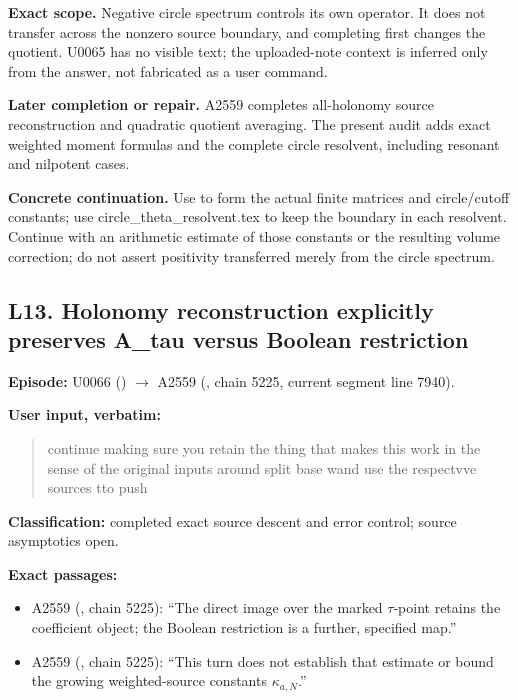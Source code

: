 \documentclass[10pt,a4paper,oneside]{report}
\providecommand{\tightlist}{\setlength{\itemsep}{0pt}\setlength{\parskip}{0pt}}
\begin{document}
\textbf{Exact scope.} Negative circle spectrum controls its own
operator. It does not transfer across the nonzero source boundary, and
completing first changes the quotient. U0065 has no visible text; the
uploaded-note context is inferred only from the answer, not fabricated
as a user command.

\textbf{Later completion or repair.} A2559 completes all-holonomy source
reconstruction and quadratic quotient averaging. The present audit adds
exact weighted moment formulas and the complete circle resolvent,
including resonant and nilpotent cases.

\textbf{Concrete continuation.} Use
\protect{} to form the actual
finite matrices and circle/cutoff constants; use
circle\_theta\_resolvent.tex to keep the boundary in each resolvent.
Continue with an arithmetic estimate of those constants or the resulting
volume correction; do not assert positivity transferred merely from the
circle spectrum.

\subsection{L13. Holonomy reconstruction explicitly preserves A\_tau
versus Boolean
restriction}\label{l13.-holonomy-reconstruction-explicitly-preserves-a_tau-versus-boolean-restriction}

\textbf{Episode:} U0066
(\protect{})
\allowbreak{}\ensuremath{→}\allowbreak{} A2559
(\protect{}, chain 5225,
current segment line 7940).

\textbf{User input, verbatim:}

\begin{quote}
continue making sure you retain the thing that makes this work in the
sense of the original inputs around split base wand use the respectvve
sources tto push
\end{quote}

\textbf{Classification:} completed exact source descent and error
control; source asymptotics open.

\textbf{Exact passages:}

\begin{itemize}
\tightlist
\item
  A2559 (\protect{}, chain
  5225): ``The direct image over the marked \(\tau\)-point retains the
  coefficient object; the Boolean restriction is a further, specified
  map.''
\item
  A2559 (\protect{}, chain
  5225): ``This turn does not establish that estimate or bound the
  growing weighted-source constants \(\kappa_{a,N}\).''
\end{itemize}
\end{document}
